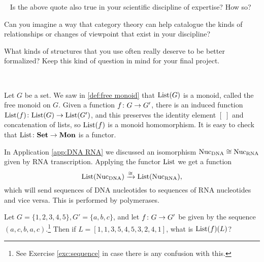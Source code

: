 \documentclass[CT4S-EN-RU]{subfiles}
\begin{document}
\begin{remarkRUS}
\end{remarkRUS}

\begin{exerciseENG}~
\sexc Is the above quote also true in your scientific discipline of expertise? How so? 
\item Can you imagine a way that category theory can help catalogue the kinds of relationships or changes of viewpoint that exist in your discipline? 
\item What kinds of structures that you use often really deserve to be better formalized?
\endsexc
Keep this kind of question in mind for your final project.
\end{exerciseENG}

\begin{exerciseRUS}~
\end{exerciseRUS}

\begin{exampleENG}\label{ex:free monoid}
Let $G$ be a set. We saw in \ref{def:free monoid} that $\textnormal{List}(G)$ is a monoid, called the free monoid on $G$. Given a function $f\colon G\rightarrow G'$, there is an induced function $\textnormal{List}(f)\colon\textnormal{List}(G)\rightarrow\textnormal{List}(G')$, and this preserves the identity element $[\;]$ and concatenation of lists, so $\textnormal{List}(f)$ is a monoid homomorphism. It is easy to check that $\textnormal{List}\colon{\bf Set}\rightarrow{\bf Mon}$ is a functor.
\end{exampleENG}

\begin{exampleRUS}\label{ex:free monoid}
\end{exampleRUS}

\begin{applicationENG}\label{app:polymerase}
In Application \ref{app:DNA RNA} we discussed an isomorphism $\textnormal{Nuc}_\textnormal{DNA}\cong\textnormal{Nuc}_\textnormal{RNA}$ given by RNA transcription. Applying the functor $\textnormal{List}$ we get a function $$\textnormal{List}(\textnormal{Nuc}_\textnormal{DNA})\xrightarrow{\cong}\textnormal{List}(\textnormal{Nuc}_\textnormal{RNA}),$$ which will send sequences of DNA nucleotides to sequences of RNA nucleotides and vice versa. This is performed by polymerases.
\end{applicationENG}

\begin{applicationRUS}\label{app:polymerase}
\end{applicationRUS}

\begin{exerciseENG}\label{exc:list as functor}
Let $G=\{1,2,3,4,5\}, G'=\{a,b,c\}$, and let $f\colon G\rightarrow G'$ be given by the sequence $(a,c,b,a,c)$.\footnote{See Exercise \ref{exc:sequence} in case there is any confusion with this.} Then if $L=[1,1,3,5,4,5,3,2,4,1]$, what is $\textnormal{List}(f)(L)$?
\end{exerciseENG}
\end{document}
